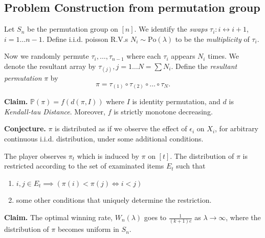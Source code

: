 \subsection{Problem Construction from permutation group}


Let $S_n$ be the permutation group on $[n]$. We identify the \textit{swaps} $\tau_i: i \leftrightarrow i+1$, $i = 1\ldots n-1$. Define i.i.d. poisson R.V.s $N_i \sim \text{Po}(\lambda)$ to be the \textit{multiplicity} of $\tau_i$.

Now we randomly permute $\tau_i,\ldots, \tau_{n-1}$ where each $\tau_i$ appears $N_i$ times. We denote the resultant array by $\tau_{(j)}, j = 1\ldots N = \sum N_i$. Define the \textit{resultant permutation} $\pi$ by \[
\pi = \tau_{(1)} \circ \tau_{(2)} \circ \ldots \circ \tau_{N}
.\] 

\textbf{Claim.} $\mathbb{P}(\pi) = f(d(\pi, I))$ where $I$ is identity permutation, and $d$ is \textit{Kendall-tau Distance}. Moreover, $f$ is strictly monotone decreasing.

\textbf{Conjecture.} $\pi$ is distributed as if we observe the effect of $\epsilon_i$ on $X_i$, for arbitrary continuous i.i.d. distribution, under some additional conditions.

The player observes $\pi_t$ which is induced by $\pi$ on $[t]$. The distribution of $\pi$ is restricted according to the set of examinated items $E_t$ such that
\begin{enumerate}
	\item $i,j \in E_t \implies \left( \pi(i) < \pi(j) \iff i < j \right) $
	\item some other conditions that uniquely determine the restriction.
\end{enumerate}

\textbf{Claim.} The optimal winning rate, $W_n(\lambda)$ goes to  $\frac{1}{(k+1)e}$ as $\lambda \to \infty$, where the distribution of $\pi$ becomes uniform in $S_n$.
